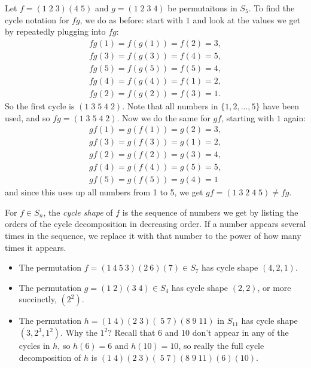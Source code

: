 \documentclass[11pt,dvipsnames]{book}
\numberwithin{equation}{section} %
\numberwithin{figure}{section} %
\numberwithin{table}{section} %
\begin{document}
\begin{example}
Let $f=(1 \; 2 \; 3)(4 \; 5)$ and $g=(1 \; 2 \; 3 \; 4)$ be permutaitons in $S_{5}$. To find the cycle notation for $fg$, we do as before: start with $1$ and look at the values we get by repeatedly plugging into $fg$:
\begin{align*}
fg(1) = f(g(1)) = f(2) = 3, \\
fg(3) = f(g(3))=f(4)=5,\\
  fg(5) = f(g(5)) = f(5) = 4,\\
  fg(4) = f(g(4)) = f(1) = 2, \\
  fg(2) = f(g(2)) = f(3) = 1.
\end{align*}
So the first cycle is $(1 \; 3 \; 5 \; 4 \; 2)$. Note that all numbers in $\{1,2,...,5\}$ have been used, and so $fg = (1 \; 3 \; 5 \; 4 \; 2)$. Now we do the same for $gf$, starting with $1$ again:
\begin{align*}
gf(1) = g(f(1)) = g(2) = 3, \\  gf(3) = g(f(3)) = g(1) = 2,  \\ gf(2) = g(f(2)) = g(3) = 4,  \\ gf(4) = g(f(4)) = g(5) = 5,  \\ gf(5) =  g(f(5))  = g(4) = 1
\end{align*}
and since this uses up all numbers from 1 to 5, we get $gf = (1\; 3 \; 2 \; 4 \; 5)\neq fg$. 
\end{example}



For $f\in S_{n}$, the {\it cycle shape} of $f$ is the sequence of numbers we get by listing the orders of the cycle decomposition in decreasing order. If a number appears several times in the sequence, we replace it with that number to the power of how many times it appears.

\begin{example}
\begin{itemize}
\item 
The permutation $f=(1\ 4\ 5\ 3)(2\ 6)(7)\in S_{7}$ has cycle shape $(4,2,1)$. 
\item The permutation $g=(1 \; 2) (3 \; 4) \in S_{4}$ has cycle shape $(2,2)$, or more succinctly, $(2^2)$. 
\item The permutation $h = (1 \; 4)(2\; 3) (\;5 \; 7)(8 \; 9 \;11)$ in $S_{11}$ has cycle shape $(3,2^3,1^2)$. Why the $1^2$? Recall that $6$ and $10$ don't appear in any of the cycles in $h$, so $h(6)=6$ and $h(10)=10$, so really the full cycle decomposition of $h$ is $(1 \; 4)(2\; 3) (\;5 \; 7)(8 \; 9 \;11)(6)(10)$. 
\end{itemize}
\end{example}
\end{document}
